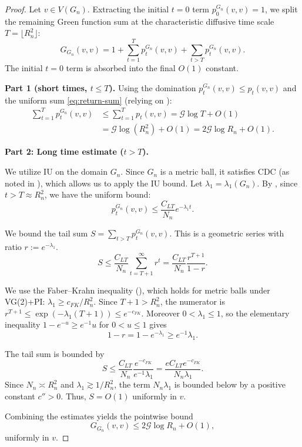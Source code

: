 \documentclass[reqno]{amsart}
\numberwithin{equation}{section}
\theoremstyle{definition}
\theoremstyle{remark}
\newcommand{\cG}{\mathcal{G}}
\begin{document}
\begin{proof}
Let $v \in V(G_n)$. Extracting the initial $t=0$ term $p_0^{G_n}(v,v)=1$, we split the remaining Green function sum at the characteristic diffusive time scale $T = \lfloor R_n^2 \rfloor$:
\[
G_{G_n}(v,v) = 1 + \sum_{t=1}^{T} p_t^{G_n}(v,v) + \sum_{t > T} p_t^{G_n}(v,v).
\]
The initial $t=0$ term is absorbed into the final $O(1)$ constant.

\textbf{Part 1 (short times, $t\le T$).} Using the domination $p_t^{G_n}(v,v)\le p_t(v,v)$ and the uniform sum \eqref{eq:return-sum} (relying on ):
\begin{align*}
\sum_{t=1}^{T} p_t^{G_n}(v,v) &\leq \sum_{t=1}^{T} p_t(v,v) = \cG \log T + O(1) \\
&= \cG \log(R_n^2) + O(1) = 2\cG \log R_n + O(1).
\end{align*}

\textbf{Part 2: Long time estimate ($t > T$).}

We utilize IU on the domain $G_n$. Since $G_n$ is a metric ball, it satisfies CDC (as noted in ), which allows us to apply the IU bound. Let $\lambda_1 = \lambda_1(G_n)$. By , since $t > T \approx R_n^2$, we have the uniform bound:
\begin{equation}
p_t^{G_n}(v,v) \leq \frac{C_{LT}}{N_n} e^{-\lambda_1 t}.
\end{equation}

We bound the tail sum $S = \sum_{t > T} p_t^{G_n}(v,v)$. This is a geometric series with ratio $r:=e^{-\lambda_1}$.
\[
S \leq \frac{C_{LT}}{N_n} \sum_{t=T+1}^\infty r^t = \frac{C_{LT}}{N_n} \frac{r^{T+1}}{1-r}.
\]

We use the Faber--Krahn inequality (), which holds for metric balls under VG(2)+PI: $\lambda_1 \geq c_{FK}/R_n^2$. Since $T+1 > R_n^2$, the numerator is $r^{T+1} \leq \exp(-\lambda_1(T+1)) \leq e^{-c_{FK}}$. Moreover $0<\lambda_1\le 1$, so the elementary inequality $1-e^{-u}\ge e^{-1}u$ for $0<u\le 1$ gives
\[
1-r = 1-e^{-\lambda_1} \ge e^{-1}\lambda_1.
\]

The tail sum is bounded by
\[
S \leq \frac{C_{LT}}{N_n} \frac{e^{-c_{FK}}}{e^{-1}\lambda_1} = \frac{e C_{LT} e^{-c_{FK}}}{N_n \lambda_1}.
\]
Since $N_n \asymp R_n^2$ and $\lambda_1 \gtrsim 1/R_n^2$, the term $N_n \lambda_1$ is bounded below by a positive constant $c''>0$. Thus, $S = O(1)$ uniformly in $v$.

Combining the estimates yields the pointwise bound
\[
G_{G_n}(v,v) \leq 2\cG \log R_n + O(1),
\]
uniformly in $v$.
\end{proof}
\end{document}
